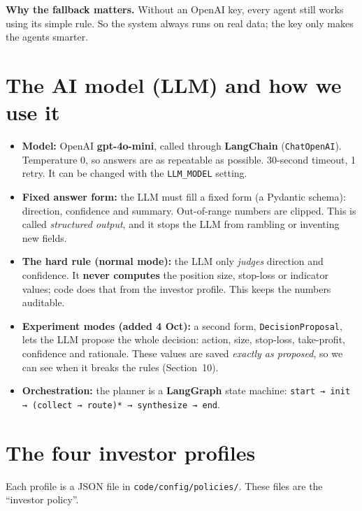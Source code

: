 \documentclass[10.5pt,a4paper]{article}
\newcommand{\file}[1]{\texttt{#1}}
\begin{document}
\textbf{Why the fallback matters.} Without an OpenAI key, every agent still works using its simple rule. So the system always runs on real data; the key only makes the agents smarter.

\section{The AI model (LLM) and how we use it}

\begin{itemize}
\item \textbf{Model:} OpenAI \textbf{gpt-4o-mini}, called through \textbf{LangChain} (\file{ChatOpenAI}). Temperature 0, so answers are as repeatable as possible. 30-second timeout, 1 retry. It can be changed with the \file{LLM\_MODEL} setting.
\item \textbf{Fixed answer form:} the LLM must fill a fixed form (a Pydantic schema): direction, confidence and summary. Out-of-range numbers are clipped. This is called \emph{structured output}, and it stops the LLM from rambling or inventing new fields.
\item \textbf{The hard rule (normal mode):} the LLM only \emph{judges} direction and confidence. It \textbf{never computes} the position size, stop-loss or indicator values; code does that from the investor profile. This keeps the numbers auditable.
\item \textbf{Experiment modes (added 4 Oct):} a second form, \file{DecisionProposal}, lets the LLM propose the whole decision: action, size, stop-loss, take-profit, confidence and rationale. These values are saved \emph{exactly as proposed}, so we can see when it breaks the rules (Section~10).
\item \textbf{Orchestration:} the planner is a \textbf{LangGraph} state machine: \file{start → init → (collect → route)* → synthesize → end}.
\end{itemize}

\section{The four investor profiles}

Each profile is a JSON file in \file{code/config/policies/}. These files are the ``investor policy''.
\end{document}
